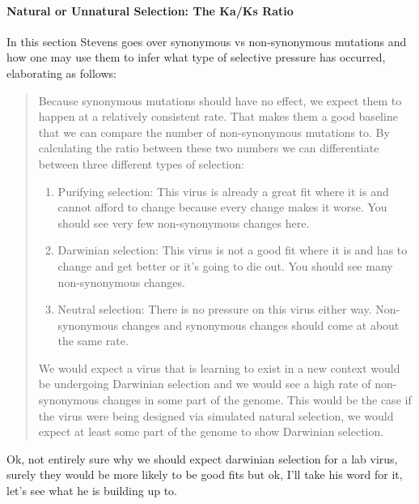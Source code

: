\documentclass[11pt]{article}
\begin{document}
\paragraph{Natural or Unnatural Selection: The Ka/Ks Ratio}
\label{sec:org9b4a9b5}
In this section Stevens goes over synonymous vs non-synonymous mutations and how one may use them to infer what type of selective pressure has occurred, elaborating as follows:
\begin{quote}
Because synonymous mutations should have no effect, we expect them to happen at a relatively consistent rate. That makes them a good baseline that we can compare the number of non-synonymous mutations to. By calculating the ratio between these two numbers we can differentiate between three different types of selection:

\begin{enumerate}
\item Purifying selection: This virus is already a great fit where it is and cannot afford to change because every change makes it worse. You should see very few non-synonymous changes here.
\item Darwinian selection: This virus is not a good fit where it is and has to change and get better or it’s going to die out. You should see many non-synonymous changes.
\item Neutral selection: There is no pressure on this virus either way. Non-synonymous changes and synonymous changes should come at about the same rate.
\end{enumerate}

We would expect a virus that is learning to exist in a new context would be undergoing Darwinian selection and we would see a high rate of non-synonymous changes in some part of the genome. This would be the case if the virus were being designed via simulated natural selection, we would expect at least some part of the genome to show Darwinian selection.
\end{quote}
Ok, not entirely sure why we should expect darwinian selection for a lab virus, surely they would be more likely to be good fits but ok, I'll take his word for it, let's see what he is building up to.
\end{document}

